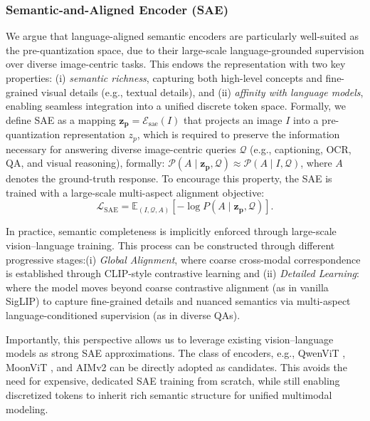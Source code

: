 \documentclass{article}
\begin{document}
\subsubsection{Semantic-and-Aligned Encoder (SAE)} 


We argue that language-aligned semantic encoders are particularly well-suited as the pre-quantization space, due to their large-scale language-grounded supervision over diverse image-centric tasks. This endows the representation with two key properties: (i) \textit{semantic richness}, capturing both high-level concepts and fine-grained visual details (e.g., textual details), and (ii) \textit{affinity with language models}, enabling seamless integration into a unified discrete token space.
Formally, we define SAE as a mapping $\mathbf{z_p} = \mathcal{E}_{\text{sae}}(I)$ that projects an image $I$ into a pre-quantization representation $z_p$, which is required to preserve the information necessary for answering diverse image-centric queries $\mathcal{Q}$ (e.g., captioning, OCR, QA, and visual reasoning), formally: $\mathcal{P}(A \mid \mathbf{z_p}, \mathcal{Q}) \approx \mathcal{P}(A \mid I, \mathcal{Q})$,
where $A$ denotes the ground-truth response. To encourage this property, the SAE is trained with a large-scale multi-aspect alignment objective:
\begin{equation}
\mathcal{L}_{\text{SAE}} =
\mathbb{E}_{(I,\mathcal{Q},A)}
\left[
-\log P(A \mid \mathbf{z_p}, \mathcal{Q})
\right].
\end{equation}

In practice, semantic completeness is implicitly enforced through large-scale vision–language training.
This process can be constructed through different progressive stages:(i) \textit{Global Alignment}, where coarse cross-modal correspondence is established through CLIP-style contrastive learning and (ii) \textit{Detailed Learning}: where the model moves beyond coarse contrastive alignment (as in vanilla SigLIP) to capture fine-grained details and nuanced semantics via multi-aspect language-conditioned supervision (as in diverse QAs).

Importantly, this perspective allows us to leverage existing vision–language models as strong SAE approximations. The class of encoders, e.g., QwenViT \cite{qwenvl}, MoonViT \cite{kimivl}, and AIMv2 \cite{aimv2} can be directly adopted as candidates.
This avoids the need for expensive, dedicated SAE training from scratch, while still enabling discretized tokens to inherit rich semantic structure for unified multimodal modeling.
\end{document}
